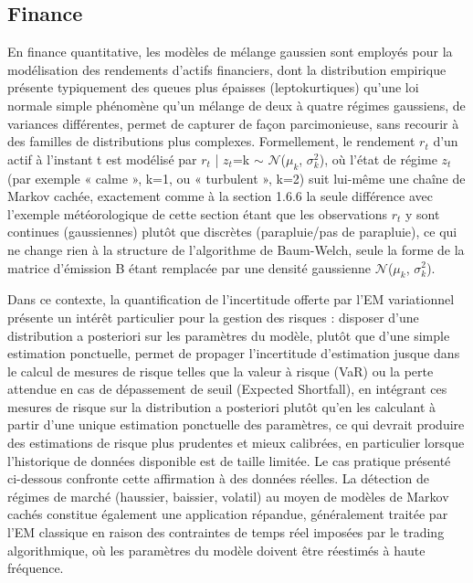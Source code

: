 \subsection{Finance}
En finance quantitative, les modèles de mélange gaussien sont employés pour la modélisation des rendements d'actifs financiers, dont la distribution empirique présente typiquement des queues plus épaisses (leptokurtiques) qu'une loi normale simple  phénomène qu'un mélange de deux à quatre régimes gaussiens, de variances différentes, permet de capturer de façon parcimonieuse, sans recourir à des familles de distributions plus complexes. Formellement, le rendement $r_{t}$ d'un actif à l'instant t est modélisé par $r_{t}$ | $z_{t}$=k $\sim $ $\mathcal{N}$($\mu _{k}$, $\sigma _{k}^{2}$), où l'état de régime $z_{t}$ (par exemple « calme », k=1, ou « turbulent », k=2) suit lui-même une chaîne de Markov cachée, exactement comme à la section 1.6.6  la seule différence avec l'exemple météorologique de cette section étant que les observations $r_{t}$ y sont continues (gaussiennes) plutôt que discrètes (parapluie/pas de parapluie), ce qui ne change rien à la structure de l'algorithme de Baum-Welch, seule la forme de la matrice d'émission B étant remplacée par une densité gaussienne $\mathcal{N}$($\mu _{k}$, $\sigma _{k}^{2}$).

Dans ce contexte, la quantification de l'incertitude offerte par l'EM variationnel présente un intérêt particulier pour la gestion des risques : disposer d'une distribution a posteriori sur les paramètres du modèle, plutôt que d'une simple estimation ponctuelle, permet de propager l'incertitude d'estimation jusque dans le calcul de mesures de risque telles que la valeur à risque (VaR) ou la perte attendue en cas de dépassement de seuil (Expected Shortfall), en intégrant ces mesures de risque sur la distribution a posteriori plutôt qu'en les calculant à partir d'une unique estimation ponctuelle des paramètres, ce qui devrait produire des estimations de risque plus prudentes et mieux calibrées, en particulier lorsque l'historique de données disponible est de taille limitée. Le cas pratique présenté ci-dessous confronte cette affirmation à des données réelles. La détection de régimes de marché (haussier, baissier, volatil) au moyen de modèles de Markov cachés constitue également une application répandue, généralement traitée par l'EM classique en raison des contraintes de temps réel imposées par le trading algorithmique, où les paramètres du modèle doivent être réestimés à haute fréquence.

